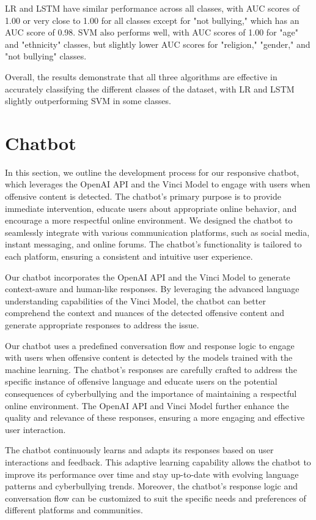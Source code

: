 \documentclass[conference]{IEEEtran}
\begin{document}
LR and LSTM have similar performance across all classes, with AUC scores of 1.00 or very close to 1.00 for all classes except for "not bullying," which has an AUC score of 0.98. SVM also performs well, with AUC scores of 1.00 for "age" and "ethnicity" classes, but slightly lower AUC scores for "religion," "gender," and "not bullying" classes.

Overall, the results demonstrate that all three algorithms are effective in accurately classifying the different classes of the dataset, with LR and LSTM slightly outperforming SVM in some classes.



\section{Chatbot}

In this section, we outline the development process for our responsive chatbot, which leverages the OpenAI API and the Vinci Model to engage with users when offensive content is detected. The chatbot's primary purpose is to provide immediate intervention, educate users about appropriate online behavior, and encourage a more respectful online environment.
We designed the chatbot to seamlessly integrate with various communication platforms, such as social media, instant messaging, and online forums. The chatbot's functionality is tailored to each platform, ensuring a consistent and intuitive user experience.

Our chatbot incorporates the OpenAI API and the Vinci Model to generate context-aware and human-like responses. By leveraging the advanced language understanding capabilities of the Vinci Model, the chatbot can better comprehend the context and nuances of the detected offensive content and generate appropriate responses to address the issue.

Our chatbot uses a predefined conversation flow and response logic to engage with users when offensive content is detected by the models trained with the machine learning. The chatbot's responses are carefully crafted to address the specific instance of offensive language and educate users on the potential consequences of cyberbullying and the importance of maintaining a respectful online environment. The OpenAI API and Vinci Model further enhance the quality and relevance of these responses, ensuring a more engaging and effective user interaction.

The chatbot continuously learns and adapts its responses based on user interactions and feedback. This adaptive learning capability allows the chatbot to improve its performance over time and stay up-to-date with evolving language patterns and cyberbullying trends. Moreover, the chatbot's response logic and conversation flow can be customized to suit the specific needs and preferences of different platforms and communities.
\end{document}
